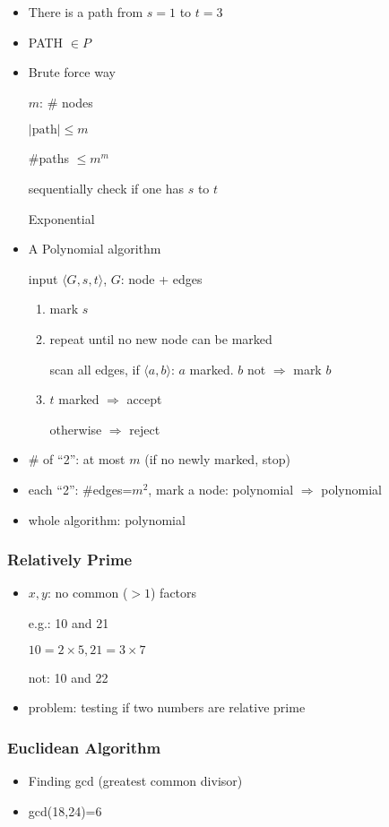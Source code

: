 \begin{frame}[allowframebreaks]
\begin{itemize}
  \begin{center}
\end{center}
\item[] There is a path from $s=1$ to $t=3$
\item PATH $\in P$
\item Brute force way

$m$: \# nodes

$|\text{path}|\leq m$

\#paths $\leq m^m$

sequentially check if one has $s$ to $t$

Exponential
\item A Polynomial algorithm

input $\langle  G,s,t\rangle $, $G$: node + edges
\begin{enumerate}
\item mark $s$


\item repeat until no new node can be marked

scan all edges, if $\langle  a,b\rangle $: $a$ marked. $b$ not
$\Rightarrow $ mark $b$
\item $t$ marked $\Rightarrow$ accept

otherwise $\Rightarrow$ reject
\end{enumerate}
\item \# of ``2'': at most $m$ (if no newly marked, stop)
\item each ``2'': \#edges=$m^2$, mark a node: polynomial
$\Rightarrow$ polynomial
\item whole algorithm: polynomial
\end{itemize}\end{frame} \begin{frame}[allowframebreaks] \frametitle{Relatively Prime}
  \begin{itemize}
\item $x,y$: no common ($> 1$) factors

e.g.: 10 and 21

$10=2 \times 5, 21
=3\times 7$

not: 10 and 22
\item problem: testing if two numbers are relative
prime
\end{itemize}\end{frame} \begin{frame}[allowframebreaks] \frametitle{Euclidean Algorithm}
  \begin{itemize}
\item Finding gcd (greatest common divisor)
\item gcd(18,24)=6


\end{itemize}
\end{frame}
